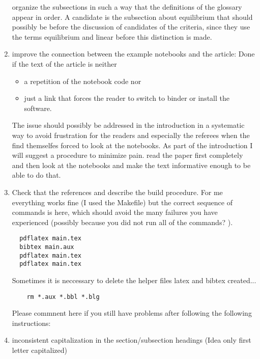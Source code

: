 \begin{enumerate}
    organize the subsections in such a way that the definitions of the glossary appear in order. A candidate is the subsection about equilibrium that should possibly be before the discussion of candidates of the criteria, since they use the terms equilibrium and linear before this distinction is made.
 \item
  improve the connection between the example notebooks and the
  article: Done if the text of the article is neither
  \begin{itemize} \item a repetition of the notebook code nor \item
  just a link that forces the reader to switch to binder or install
  the software.  \end{itemize}
  
  The issue should possibly be addressed in the introduction in a systematic way to 
  avoid frustration for the readers and especially the referees when the find themselfes forced to look at the notebooks.
  As part of the introduction I will suggest a procedure to minimize pain.
  read the paper first completely and then look at the notebooks and make the text informative enough to be able to do that.
  \item
  Check that the references and describe the build procedure.
  For me everything works fine (I used the Makefile) but the correct sequence of commands is here, which should avoid the many failures you have experienced (possibly because you did not run all of the commands? ).
  \begin{verbatim}
  pdflatex main.tex
  bibtex main.aux
  pdflatex main.tex
  pdflatex main.tex
  \end{verbatim}
  Sometimes it is neccessary to delete the helper files latex and bibtex created...

  \begin{verbatim}
	rm *.aux *.bbl *.blg
  \end{verbatim}
  Please commnent here if you still have problems after following the following instructions:
  \item inconsistent capitalization in the section/subsection headings (Idea only first letter capitalized)

\end{enumerate}
